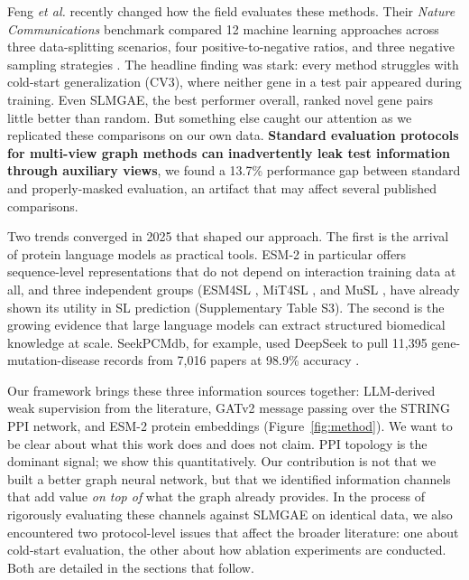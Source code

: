 \documentclass[12pt,a4paper]{article}
\begin{document}
Feng \textit{et al.} recently changed how the field evaluates these methods. Their \textit{Nature Communications} benchmark compared 12 machine learning approaches across three data-splitting scenarios, four positive-to-negative ratios, and three negative sampling strategies \cite{feng2024}. The headline finding was stark: every method struggles with cold-start generalization (CV3), where neither gene in a test pair appeared during training. Even SLMGAE, the best performer overall, ranked novel gene pairs little better than random. But something else caught our attention as we replicated these comparisons on our own data. \textbf{Standard evaluation protocols for multi-view graph methods can inadvertently leak test information through auxiliary views}, we found a 13.7\% performance gap between standard and properly-masked evaluation, an artifact that may affect several published comparisons.

Two trends converged in 2025 that shaped our approach. The first is the arrival of protein language models as practical tools. ESM-2 \cite{lin2023} in particular offers sequence-level representations that do not depend on interaction training data at all, and three independent groups (ESM4SL \cite{yang2025}, MiT4SL \cite{tao2025}, and MuSL \cite{feng2026}, have already shown its utility in SL prediction (Supplementary Table S3). The second is the growing evidence that large language models can extract structured biomedical knowledge at scale. SeekPCMdb, for example, used DeepSeek to pull 11,395 gene-mutation-disease records from 7,016 papers at 98.9\% accuracy \cite{seekpcmdb2025}.

Our framework brings these three information sources together: LLM-derived weak supervision from the literature, GATv2 message passing over the STRING PPI network, and ESM-2 protein embeddings (Figure~\ref{fig:method}). We want to be clear about what this work does and does not claim. PPI topology is the dominant signal; we show this quantitatively. Our contribution is not that we built a better graph neural network, but that we identified information channels that add value \textit{on top of} what the graph already provides. In the process of rigorously evaluating these channels against SLMGAE on identical data, we also encountered two protocol-level issues that affect the broader literature: one about cold-start evaluation, the other about how ablation experiments are conducted. Both are detailed in the sections that follow.

\end{document}
